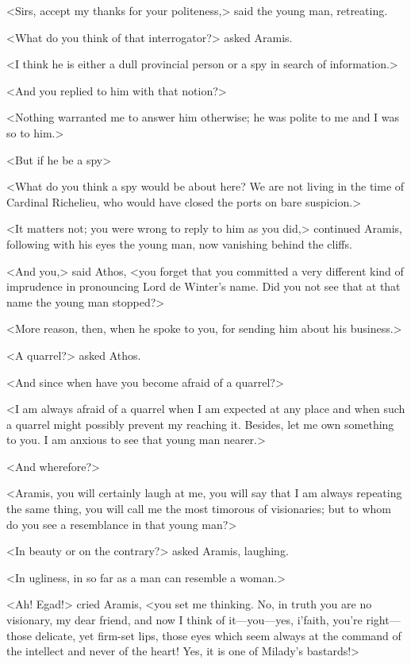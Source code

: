 <Sirs, accept my thanks for your politeness,> said the young man, retreating.

<What do you think of that interrogator?> asked Aramis.

<I think he is either a dull provincial person or a spy in search of information.>

<And you replied to him with that notion?>

<Nothing warranted me to answer him otherwise; he was polite to me and I was so to him.>

<But if he be a spy\longdash>

<What do you think a spy would be about here? We are not living in the time of Cardinal Richelieu, who would have closed the ports on bare suspicion.>

<It matters not; you were wrong to reply to him as you did,> continued Aramis, following with his eyes the young man, now vanishing behind the cliffs.

<And you,> said Athos, <you forget that you committed a very different kind of imprudence in pronouncing Lord de Winter's name. Did you not see that at that name the young man stopped?>

<More reason, then, when he spoke to you, for sending him about his business.>

<A quarrel?> asked Athos.

<And since when have you become afraid of a quarrel?>

<I am always afraid of a quarrel when I am expected at any place and when such a quarrel might possibly prevent my reaching it. Besides, let me own something to you. I am anxious to see that young man nearer.>

<And wherefore?>

<Aramis, you will certainly laugh at me, you will say that I am always repeating the same thing, you will call me the most timorous of visionaries; but to whom do you see a resemblance in that young man?>

<In beauty or on the contrary?> asked Aramis, laughing.

<In ugliness, in so far as a man can resemble a woman.>

<Ah! Egad!> cried Aramis, <you set me thinking. No, in truth you are no visionary, my dear friend, and now I think of it—you—yes, i'faith, you're right—those delicate, yet firm-set lips, those eyes which seem always at the command of the intellect and never of the heart! Yes, it is one of Milady's bastards!>

